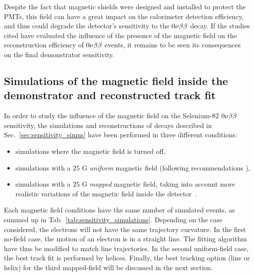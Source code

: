 Despite the fact that magnetic shields were designed and installed to protect the PMTs, this field can have a great impact on the calorimeter detection efficiency, and thus could degrade the detector's sensitivity to the $0\nu\beta\beta$ decay.
If the studies cited have evaluated the influence of the presence of the magnetic field on the reconstruction efficiency of $0\nu\beta\beta$ events, it remains to be seen its consequences on the final demonstrator sensitivity.

\subsection{Simulations of the magnetic field inside the demonstrator and reconstructed track fit}

In order to study the influence of the magnetic field on the Selenium-$82$ $0\nu\beta\beta$ sensitivity, the simulations and reconstructions of decays described in Sec.~\ref{sec:sensitivity_simus} have been performed in three different conditions:
\begin{itemize}
\item simulations where the magnetic field is turned off,
\item simulations with a $25$ G \emph{uniform} magnetic field (following recommendations \cite{CalvezThesis}),
\item simulations with a $25$ G \emph{mapped} magnetic field, taking into account more realistic variations of the magnetic field inside the detector~\cite{docdb:map_magnetic_field2015}.
\end{itemize}
Each magnetic field conditions have the same number of simulated events, as summed up in Tab.~\ref{tab:sensitivity_simulations}.
Depending on the case considered, the electrons will not have the same trajectory curvature.
In the first no-field case, the motion of an electron is in a straight line.
The fitting algorithm have thus be modified to match line trajectories.
In the second uniform-field case, the best track fit is performed by helices.
Finally, the best tracking option (line or helix) for the third mapped-field will be discussed in the next section.




